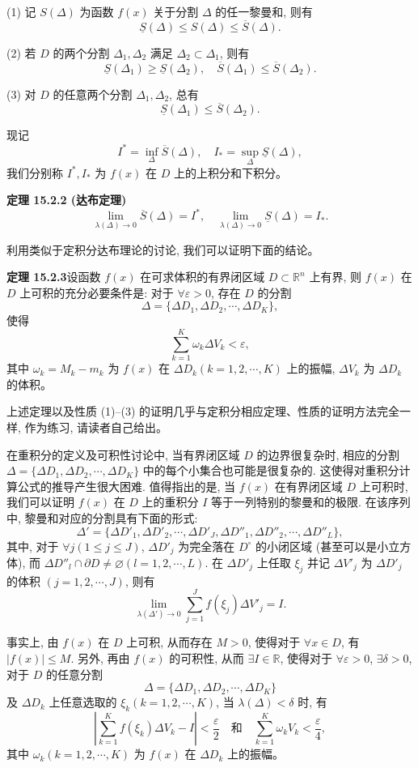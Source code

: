 \documentclass[UTF8,12pt,a4paper,fontset=fandol]{ctexart}
\begin{document}
(1) 记 $S(\Delta)$ 为函数 $f(x)$ 关于分割 $\Delta$ 的任一黎曼和, 则有
\[
  \underline S(\Delta)\leqslant S(\Delta)\leqslant\overline S(\Delta).
\]

(2) 若 $D$ 的两个分割 $\Delta_1,\Delta_2$ 满足 $\Delta_2\subset\Delta_1$, 则有
\[
  \underline S(\Delta_1)\geqslant\underline S(\Delta_2),\quad
  \overline S(\Delta_1)\leqslant\overline S(\Delta_2).
\]

(3) 对 $D$ 的任意两个分割 $\Delta_1,\Delta_2$, 总有
\[
  \underline S(\Delta_1)\leqslant\overline S(\Delta_2).
\]

现记
\[
  I^*=\inf_\Delta\overline S(\Delta),\quad
  I_*=\sup_\Delta\underline S(\Delta),
\]
我们分别称 $I^*,I_*$ 为 $f(x)$ 在 $D$ 上的上积分和下积分。

\noindent\textbf{定理 15.2.2 (达布定理)}\quad
\[
  \lim_{\lambda(\Delta)\to0}\overline S(\Delta)=I^*,\quad
  \lim_{\lambda(\Delta)\to0}\underline S(\Delta)=I_*.
\]

利用类似于定积分达布理论的讨论, 我们可以证明下面的结论。

\noindent\textbf{定理 15.2.3}\quad 设函数 $f(x)$ 在可求体积的有界闭区域 $D\subset\mathbb R^n$ 上有界, 则 $f(x)$ 在 $D$ 上可积的充分必要条件是: 对于 $\forall\varepsilon>0$, 存在 $D$ 的分割
\[
  \Delta=\{\Delta D_1,\Delta D_2,\cdots,\Delta D_K\},
\]
使得
\[
  \sum_{k=1}^K\omega_k\Delta V_k<\varepsilon,
\]
其中 $\omega_k=M_k-m_k$ 为 $f(x)$ 在 $\Delta D_k(k=1,2,\cdots,K)$ 上的振幅, $\Delta V_k$ 为 $\Delta D_k$ 的体积。

上述定理以及性质 (1)--(3) 的证明几乎与定积分相应定理、性质的证明方法完全一样, 作为练习, 请读者自己给出。

在重积分的定义及可积性讨论中, 当有界闭区域 $D$ 的边界很复杂时, 相应的分割 $\Delta=\{\Delta D_1,\Delta D_2,\cdots,\Delta D_K\}$ 中的每个小集合也可能是很复杂的. 这使得对重积分计算公式的推导产生很大困难. 值得指出的是, 当 $f(x)$ 在有界闭区域 $D$ 上可积时, 我们可以证明 $f(x)$ 在 $D$ 上的重积分 $I$ 等于一列特别的黎曼和的极限. 在该序列中, 黎曼和对应的分割具有下面的形式:
\[
  \Delta'=\{\Delta D'_1,\Delta D'_2,\cdots,\Delta D'_J,\Delta D''_1,\Delta D''_2,\cdots,\Delta D''_L\},
\]
其中, 对于 $\forall j(1\leqslant j\leqslant J)$, $\Delta D'_j$ 为完全落在 $D^\circ$ 的小闭区域 (甚至可以是小立方体), 而 $\Delta D''_l\cap\partial D\ne\varnothing(l=1,2,\cdots,L)$. 在 $\Delta D'_j$ 上任取 $\xi_j$ 并记 $\Delta V'_j$ 为 $\Delta D'_j$ 的体积 $(j=1,2,\cdots,J)$, 则有
\[
  \lim_{\lambda(\Delta')\to0}\sum_{j=1}^J f(\xi_j)\Delta V'_j=I.
\]

事实上, 由 $f(x)$ 在 $D$ 上可积, 从而存在 $M>0$, 使得对于 $\forall x\in D$, 有 $|f(x)|\leqslant M$. 另外, 再由 $f(x)$ 的可积性, 从而 $\exists I\in\mathbb R$, 使得对于 $\forall\varepsilon>0$, $\exists\delta>0$, 对于 $D$ 的任意分割
\[
  \Delta=\{\Delta D_1,\Delta D_2,\cdots,\Delta D_K\}
\]
及 $\Delta D_k$ 上任意选取的 $\xi_k(k=1,2,\cdots,K)$, 当 $\lambda(\Delta)<\delta$ 时, 有
\[
  \left|\sum_{k=1}^K f(\xi_k)\Delta V_k-I\right|<\frac{\varepsilon}{2}
  \quad\text{和}\quad
  \sum_{k=1}^K\omega_kV_k<\frac{\varepsilon}{4},
\]
其中 $\omega_k(k=1,2,\cdots,K)$ 为 $f(x)$ 在 $\Delta D_k$ 上的振幅。
\end{document}
